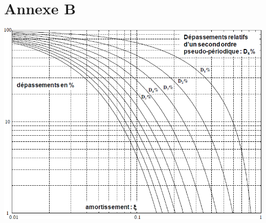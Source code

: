 \documentclass[10pt]{article}
\begin{document}
{\section*{Annexe B}
\begin{center}
\includegraphics[width=.8\textwidth]{images/annexeE}
\end{center}
}
\end{document}
